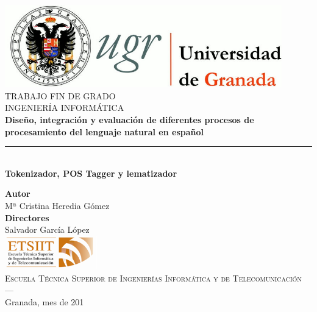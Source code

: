 \begin{titlepage}
 
\newlength{\centeroffset}
\setlength{\centeroffset}{-0.5\oddsidemargin}
\addtolength{\centeroffset}{0.5\evensidemargin}
\thispagestyle{empty}

\noindent\hspace*{\centeroffset}%

\centering
\includegraphics[width=0.9\textwidth]{imagenes/logo_ugr.jpg}\\[1.4cm]

\textsc{ \Large TRABAJO FIN DE GRADO\\[0.2cm]}
\textsc{ INGENIERÍA INFORMÁTICA}\\[1cm]
% 
{\Large\bfseries Diseño, integración y evaluación de diferentes procesos de procesamiento del lenguaje natural en español\\
}
\noindent\rule[-1ex]{\textwidth}{3pt}\\[3.5ex]
{\large\bfseries Tokenizador, POS Tagger y lematizador}

\vspace{2.5cm}
\noindent\hspace*{\centeroffset}%
\centering

\textbf{Autor}\\ {Mª Cristina Heredia Gómez}\\[2.5ex]
\textbf{Directores}\\
{Salvador García López}\\[2cm]
\includegraphics[width=0.3\textwidth]{imagenes/etsiit_logo.png}\\[0.1cm]
\textsc{Escuela Técnica Superior de Ingenierías Informática y de Telecomunicación}\\
\textsc{---}\\
Granada, mes de 201
\end{titlepage}



